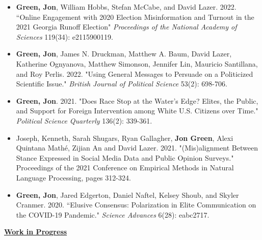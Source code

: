 \documentclass{article}
\begin{document}
\begin{itemize}
		\item \textbf{Green, Jon}, William Hobbs, Stefan McCabe, and David Lazer. 2022. ``Online Engagement with 2020 Election Misinformation and Turnout in the 2021 Georgia Runoff Election"  \textit{Proceedings of the National Academy of Sciences} 119(34): e2115900119.
		\item  \textbf{Green, Jon}, James N. Druckman, Matthew A. Baum, David Lazer, Katherine Ognyanova, Matthew Simonson, Jennifer Lin, Mauricio Santillana, and Roy Perlis. 2022. "Using General Messages to Persuade on a Politicized Scientific Issue." \textit{British Journal of Political Science} 53(2): 698-706.
		\item \textbf{Green, Jon}. 2021. "Does Race Stop at the Water's Edge? Elites, the Public, and Support for Foreign Intervention among White U.S. Citizens over Time." \textit{Political Science Quarterly} 136(2): 339-361. 
		\item Joseph, Kenneth, Sarah Shugars, Ryan Gallagher, \textbf{Jon Green}, Alexi Quintana Mathé, Zijian An and David Lazer. 2021. "(Mis)alignment Between Stance Expressed in Social Media Data and Public Opinion Surveys." Proceedings of the 2021 Conference on Empirical Methods in Natural Language Processing, pages 312-324. 
		\item \textbf{Green, Jon}, Jared Edgerton, Daniel Naftel, Kelsey Shoub, and Skyler Cranmer. 2020. ``Elusive Consensus: Polarization in Elite Communication on the COVID-19 Pandemic." \textit{Science Advances} 6(28): eabc2717.
\end{itemize}

\noindent \textbf{\underline{Work in Progress}}
\end{document}
